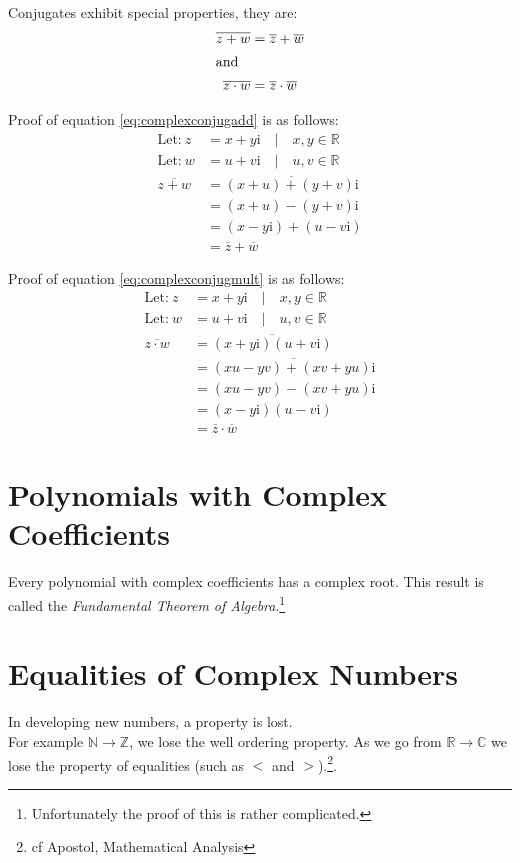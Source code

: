 Conjugates exhibit special properties, they are:
\begin{align}
  \overline{z + w} &= \overline{z} + \overline{w} \label{eq:complexconjugadd}\\
  \intertext{and}
  \overline{z\cdot w} &= \overline{z} \cdot \overline{w} \label{eq:complexconjugmult}
\end{align}

Proof of equation \ref{eq:complexconjugadd} is as follows:
\begin{align}
  \text{Let:}~z &= x + y\text{i} \quad | \quad x,y \in \mathbb{R} \\
  \text{Let:}~w &= u + v\text{i} \quad | \quad u,v \in \mathbb{R} \\
  \overline{z + w} &= \overline{(x+u)+(y+v)\text{i}} \\
    &= (x+u)-(y+v)\text{i} \\
    &= (x-y\text{i}) + (u-v\text{i}) \\
    &= \overline{z} + \overline{w}
\end{align}\qedbitches

Proof of equation \ref{eq:complexconjugmult} is as follows:
\begin{align}
  \text{Let:}~z &= x + y\text{i} \quad | \quad x,y \in \mathbb{R} \\
  \text{Let:}~w &= u + v\text{i} \quad | \quad u,v \in \mathbb{R} \\
  \overline{z \cdot w} &= \overline{(x+y\text{i})(u+v\text{i})} \\
    &= \overline{(xu-yv)+(xv+yu)\text{i}}\\
    &= (xu-yv)-(xv+yu)\text{i}\\
    &= (x - y\text{i})(u-v\text{i}) \\
    &= \overline{z} \cdot \overline{w}
\end{align}\qedbitches

\section{Polynomials with Complex Coefficients}
Every polynomial with complex coefficients has a complex root. This result is
called the \emph{Fundamental Theorem of Algebra}.\footnote{Unfortunately the
proof of this is rather complicated.}

\section{Equalities of Complex Numbers}
In developing new numbers, a property is lost. \\ For example $\mathbb{N} \to
\mathbb{Z}$, we lose the well ordering property.
As we go from $\mathbb{R} \to \mathbb{C}$ we lose the property of equalities
(such as $<$ and $>$).\footnote{cf Apostol, Mathematical Analysis}.

